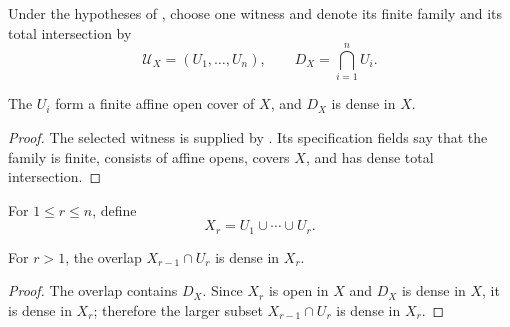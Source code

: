 \begin{definition}
  \label{def:nagata-dense-affine-cover}

  Under the hypotheses of
  , choose one witness and denote
  its finite family and its total intersection by
  \[
    \mathcal U_X=(U_1,\ldots,U_n),
    \qquad D_X=\bigcap_{i=1}^nU_i.
  \]
\end{definition}

\begin{lemma}
  \label{lemma:nagata-dense-affine-cover}

  The $U_i$ form a finite affine open cover of $X$, and $D_X$ is dense in
  $X$.
\end{lemma}

\begin{proof}
  The selected witness is supplied by
  .  Its specification fields say
  that the family is finite, consists of affine opens, covers $X$, and has
  dense total intersection.
\end{proof}

\begin{definition}
  \label{def:nagata-partial-affine-unions}

  For $1\leq r\leq n$, define
  \[
    X_r=U_1\cup\cdots\cup U_r.
  \]
\end{definition}

\begin{lemma}
  \label{lemma:nagata-partial-union-overlap-dense}

  For $r>1$, the overlap $X_{r-1}\cap U_r$ is dense in $X_r$.
\end{lemma}

\begin{proof}
  The overlap contains $D_X$.  Since $X_r$ is open in $X$ and $D_X$ is dense
  in $X$, it is dense in $X_r$; therefore the larger subset
  $X_{r-1}\cap U_r$ is dense in $X_r$.
\end{proof}

